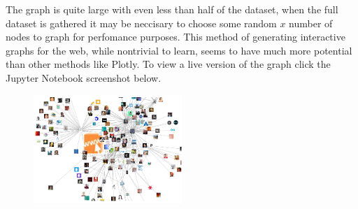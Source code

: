 \documentclass[12pt, a4paper]{article}
\begin{document}
The graph is quite large with even less than half of the dataset, when the full dataset is gathered it may be neccisary to choose some random $x$ number of nodes to graph for perfomance purposes. This method of generating interactive graphs for the web, while nontrivial to learn, seems to have much more potential than other methods like Plotly. To view a live version of the graph click the Jupyter Notebook screenshot below.

\vspace{2em}
\begin{figure}[h]
    \centering
    \href{http://datenstrom.gitlab.io/cs532-s17/d3_twitter_graph/force.html}{
        \includegraphics[width=0.50\textwidth]{dia/graph.png}
    }
\end{figure}
\end{document}
